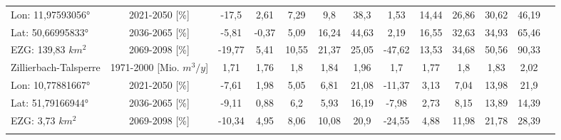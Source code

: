 \begin{longtable}{@{\extracolsep{\fill}}lc|ccccc||cccccc}
\cline{2-13} 
Lon: 11,97593056° & 2021-2050 [\%]  & -17,5 & 2,61 & 7,29 & 9,8 & 38,3 & 1,53 & 14,44 & 26,86 & 30,62 & 46,19 & \\ 
Lat: 50,66995833° & 2036-2065 [\%]  & -5,81 & -0,37 & 5,09 & 16,24 & 44,63 & 2,19 & 16,55 & 32,63 & 34,93 & 65,46 & \\ 
EZG: 139,83 $km^2$ & 2069-2098 [\%]  & -19,77 & 5,41 & 10,55 & 21,37 & 25,05 & -47,62 & 13,53 & 34,68 & 50,56 & 90,33 & \\ 
\hline 
Zillierbach-Talsperre & 1971-2000 [Mio. $m^3/y$]  & 1,71 & 1,76 & 1,8 & 1,84 & 1,96 & 1,7 & 1,77 & 1,8 & 1,83 & 2,02 & \\ 
\cline{2-13} 
Lon: 10,77881667° & 2021-2050 [\%]  & -7,61 & 1,98 & 5,05 & 6,81 & 21,08 & -11,37 & 3,13 & 7,04 & 13,98 & 21,9 & \\ 
Lat: 51,79166944° & 2036-2065 [\%]  & -9,11 & 0,88 & 6,2 & 5,93 & 16,19 & -7,98 & 2,73 & 8,15 & 13,89 & 14,39 & \\ 
EZG: 3,73 $km^2$ & 2069-2098 [\%]  & -10,34 & 4,95 & 8,06 & 10,08 & 20,9 & -24,55 & 4,88 & 11,98 & 21,78 & 28,39 & \\\hline
\label{Qrouted_daily_sum_Talsperrenforlatex}
\end{longtable}
\addtolength{\tabcolsep}{5.9pt}
